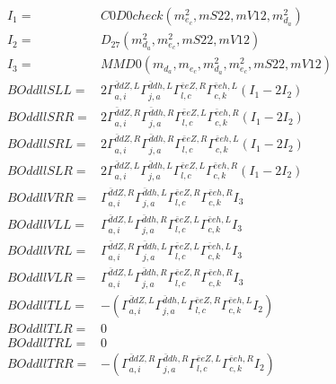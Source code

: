 \documentclass[A4,landscape]{article}
\begin{document}
\begin{align} 
I_1 = & C0D0check(m^2_{e_{{c}}}, mS22, mV12, m^2_{d_{{a}}}) \\ 
I_2 = & D_{27}(m^2_{d_{{a}}}, m^2_{e_{{c}}}, mS22, mV12) \\ 
I_3 = & MMD0(m_{d_{{a}}}, m_{e_{{c}}}, m^2_{d_{{a}}}, m^2_{e_{{c}}}, mS22, mV12) \\ 
  BOddllSLL= & 2  \Gamma^{\bar{d}d Z ,L}_{a, i} \Gamma^{\bar{d}d h ,L}_{j, a} \Gamma^{\bar{e}e Z ,R}_{l, c} \Gamma^{\bar{e}e h ,L}_{c, k} (I_1 - 2 I_2) \\ 
  BOddllSRR= & 2  \Gamma^{\bar{d}d Z ,R}_{a, i} \Gamma^{\bar{d}d h ,R}_{j, a} \Gamma^{\bar{e}e Z ,L}_{l, c} \Gamma^{\bar{e}e h ,R}_{c, k} (I_1 - 2 I_2) \\ 
  BOddllSRL= & 2  \Gamma^{\bar{d}d Z ,R}_{a, i} \Gamma^{\bar{d}d h ,R}_{j, a} \Gamma^{\bar{e}e Z ,R}_{l, c} \Gamma^{\bar{e}e h ,L}_{c, k} (I_1 - 2 I_2) \\ 
  BOddllSLR= & 2  \Gamma^{\bar{d}d Z ,L}_{a, i} \Gamma^{\bar{d}d h ,L}_{j, a} \Gamma^{\bar{e}e Z ,L}_{l, c} \Gamma^{\bar{e}e h ,R}_{c, k} (I_1 - 2 I_2) \\ 
  BOddllVRR= &  \Gamma^{\bar{d}d Z ,R}_{a, i} \Gamma^{\bar{d}d h ,L}_{j, a} \Gamma^{\bar{e}e Z ,R}_{l, c} \Gamma^{\bar{e}e h ,R}_{c, k} I_3 \\ 
  BOddllVLL= &  \Gamma^{\bar{d}d Z ,L}_{a, i} \Gamma^{\bar{d}d h ,R}_{j, a} \Gamma^{\bar{e}e Z ,L}_{l, c} \Gamma^{\bar{e}e h ,L}_{c, k} I_3 \\ 
  BOddllVRL= &  \Gamma^{\bar{d}d Z ,R}_{a, i} \Gamma^{\bar{d}d h ,L}_{j, a} \Gamma^{\bar{e}e Z ,L}_{l, c} \Gamma^{\bar{e}e h ,L}_{c, k} I_3 \\ 
  BOddllVLR= &  \Gamma^{\bar{d}d Z ,L}_{a, i} \Gamma^{\bar{d}d h ,R}_{j, a} \Gamma^{\bar{e}e Z ,R}_{l, c} \Gamma^{\bar{e}e h ,R}_{c, k} I_3 \\ 
  BOddllTLL= & -( \Gamma^{\bar{d}d Z ,L}_{a, i} \Gamma^{\bar{d}d h ,L}_{j, a} \Gamma^{\bar{e}e Z ,R}_{l, c} \Gamma^{\bar{e}e h ,L}_{c, k} I_2) \\ 
  BOddllTLR= & 0 \\ 
  BOddllTRL= & 0 \\ 
  BOddllTRR= & -( \Gamma^{\bar{d}d Z ,R}_{a, i} \Gamma^{\bar{d}d h ,R}_{j, a} \Gamma^{\bar{e}e Z ,L}_{l, c} \Gamma^{\bar{e}e h ,R}_{c, k} I_2) \\ 
\end{align} 
\end{document}
